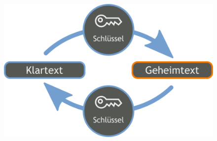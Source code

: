 \documentclass[xcolor=dvipsnames]{beamer}
\begin{document}
\begin{frame}
	\begin{figure}
	\center
	\includegraphics[scale=0.2]{symmetric_cryptography}
	\end{figure}
\end{frame}
\end{document}
